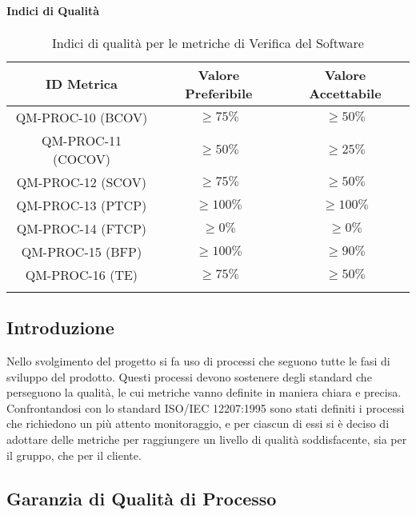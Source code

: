 		\paragraph{Indici di Qualità}

			\begin{center}
				\begin{longtable}{|c|c|c|}
				\hline
				\rowcolor{lighter-grayer}
				\textbf{ID Metrica} & \textbf{Valore Preferibile} & \textbf{Valore Accettabile}\\
				\hline
				\endfirsthead
				\hline
				QM-PROC-10 (BCOV) & \(\geq 75\%\) & \(\geq 50\%\) \\ \hline
				QM-PROC-11 (COCOV) & \(\geq 50\%\) & \(\geq 25\%\) \\ \hline
				QM-PROC-12 (SCOV) & \(\geq 75\%\) & \(\geq 50\%\) \\ \hline
				QM-PROC-13 (PTCP) & \(\geq 100\%\) & \(\geq 100\%\) \\ \hline
				QM-PROC-14 (FTCP) & \(\geq 0\%\) & \(\geq 0\%\) \\ \hline
				QM-PROC-15 (BFP) & \(\geq 100\%\) & \(\geq 90\%\) \\ \hline
				QM-PROC-16 (TE) & \(\geq 75\%\) & \(\geq 50\%\) \\ \hline
				\hline
				\caption{Indici di qualità per le metriche di Verifica del Software}
				\end{longtable}
			\end{center}







\subsection{Introduzione}

Nello svolgimento del progetto si fa uso di processi che seguono tutte le fasi di sviluppo del prodotto. Questi processi devono sostenere degli standard che perseguono la qualità, le cui metriche vanno definite in maniera chiara e precisa. Confrontandosi con lo standard ISO/IEC 12207:1995 sono stati definiti i processi che richiedono un più attento monitoraggio, e per ciascun di essi si è deciso di adottare delle metriche per raggiungere un livello di qualità soddisfacente, sia per il gruppo, che per il cliente.

\subsection{Garanzia di Qualità di Processo}

